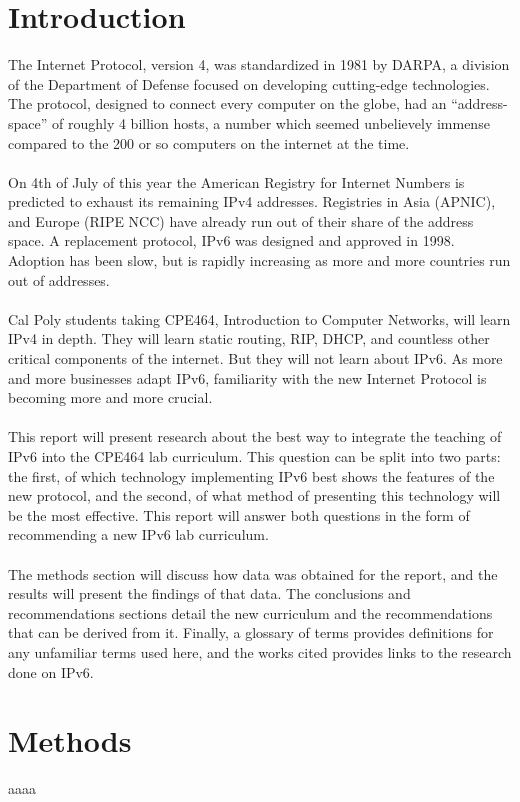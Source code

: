 \documentclass[12pt]{article}
\begin{document}
\section{Introduction}
The Internet Protocol, version 4, was standardized in 1981 by DARPA, a division of the Department of Defense focused on developing cutting-edge technologies. The protocol, designed to connect every computer on the globe, had an ``address-space'' of roughly 4 billion hosts, a number which seemed unbelievely immense compared to the 200 or so computers on the internet at the time.\\\\
On 4th of July of this year the American Registry for Internet Numbers is predicted to exhaust its remaining IPv4 addresses. Registries in Asia (APNIC), and Europe (RIPE NCC) have already run out of their share of the address space. A replacement protocol, IPv6 was designed and approved in 1998. Adoption has been slow, but is rapidly increasing as more and more countries run out of addresses.\\\\
Cal Poly students taking CPE464, Introduction to Computer Networks, will learn IPv4 in depth. They will learn static routing, RIP, DHCP, and countless other critical components of the internet. But they will not learn about IPv6. As more and more businesses adapt IPv6, familiarity with the new Internet Protocol is becoming more and more crucial.\\\\
This report will present research about the best way to integrate the teaching of IPv6 into the CPE464 lab curriculum. This question can be split into two parts: the first, of which technology implementing IPv6 best shows the features of the new protocol, and the second, of what method of presenting this technology will be the most effective. This report will answer both questions in the form of recommending a new IPv6 lab curriculum.\\\\
The methods section will discuss how data was obtained for the report, and the results will present the findings of that data. The conclusions and recommendations sections detail the new curriculum and the recommendations that can be derived from it. Finally, a glossary of terms provides definitions for any unfamiliar terms used here, and the works cited provides links to the research done on IPv6.

\section{Methods}
aaaa
\end{document}

